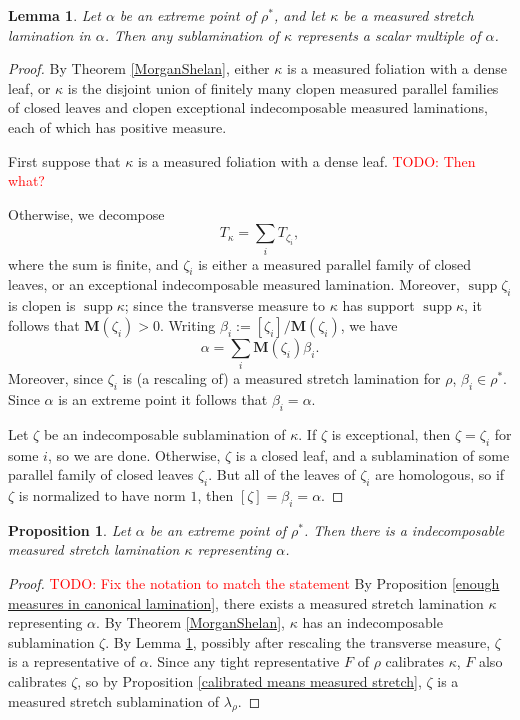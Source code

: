 \documentclass[reqno,11pt]{amsart}
\DeclareMathOperator{\supp}{supp}
\newcommand{\Mass}{\mathbf M}
\newtheorem{lemma}[theorem]{Lemma}
\newtheorem{proposition}[theorem]{Proposition}
\theoremstyle{definition}
\numberwithin{equation}{section}
\newcommand\todo[1]{\textcolor{red}{TODO: #1}}
\begin{document}
\begin{lemma}\label{extreme points are closed under sublaminations}
Let $\alpha$ be an extreme point of $\rho^*$, and let $\kappa$ be a measured stretch lamination in $\alpha$.
Then any sublamination of $\kappa$ represents a scalar multiple of $\alpha$.
\end{lemma}
\begin{proof}
By Theorem \ref{MorganShelan}, either $\kappa$ is a measured foliation with a dense leaf, or $\kappa$ is the disjoint union of finitely many clopen measured parallel families of closed leaves and clopen exceptional indecomposable measured laminations, each of which has positive measure.

First suppose that $\kappa$ is a measured foliation with a dense leaf. \todo{Then what?}

Otherwise, we decompose 
$$T_\kappa = \sum_i T_{\zeta_i},$$
where the sum is finite, and $\zeta_i$ is either a measured parallel family of closed leaves, or an exceptional indecomposable measured lamination.
Moreover, $\supp \zeta_i$ is clopen is $\supp \kappa$; since the transverse measure  to $\kappa$ has support $\supp \kappa$, it follows that $\Mass(\zeta_i) > 0$.
Writing $\beta_i := [\zeta_i]/\Mass(\zeta_i)$, we have
$$\alpha = \sum_i \Mass(\zeta_i) \beta_i.$$
Moreover, since $\zeta_i$ is (a rescaling of) a measured stretch lamination for $\rho$, $\beta_i \in \rho^*$.
Since $\alpha$ is an extreme point it follows that $\beta_i = \alpha$.

Let $\zeta$ be an indecomposable sublamination of $\kappa$.
If $\zeta$ is exceptional, then $\zeta = \zeta_i$ for some $i$, so we are done.
Otherwise, $\zeta$ is a closed leaf, and a sublamination of some parallel family of closed leaves $\zeta_i$.
But all of the leaves of $\zeta_i$ are homologous, so if $\zeta$ is normalized to have norm $1$, then $[\zeta] = \beta_i = \alpha$.
\end{proof}

\begin{proposition}\label{extreme points are indecomposable}
Let $\alpha$ be an extreme point of $\rho^*$.
Then there is a indecomposable measured stretch lamination $\kappa$ representing $\alpha$.
\end{proposition}
\begin{proof}
\todo{Fix the notation to match the statement} By Proposition \ref{enough measures in canonical lamination}, there exists a measured stretch lamination $\kappa$ representing $\alpha$.
By Theorem \ref{MorganShelan}, $\kappa$ has an indecomposable sublamination $\zeta$.
By Lemma \ref{extreme points are closed under sublaminations}, possibly after rescaling the transverse measure, $\zeta$ is a representative of $\alpha$.
Since any tight representative $F$ of $\rho$ calibrates $\kappa$, $F$ also calibrates $\zeta$, so by Proposition \ref{calibrated means measured stretch}, $\zeta$ is a measured stretch sublamination of $\lambda_\rho$.
\end{proof}
\end{document}
